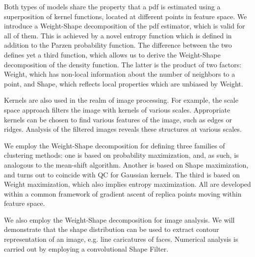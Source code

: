 \documentclass[preprint,12pt]{elsarticle}
\begin{document}
Both types of models share the property that a pdf is estimated using a superposition of kernel functions, located at different points in feature space. We introduce a Weight-Shape decomposition of the pdf estimator, which is valid for all of them. This is achieved by a novel entropy function which is defined in addition to the Parzen probability function. The difference between the two defines yet a third function, which allows us to derive the Weight-Shape decomposition of the density function. The latter is the product of two factors: Weight, which has non-local information about the number of neighbors to a point, and Shape, which reflects local properties which are unbiased by Weight.

Kernels are also used in the realm of image processing. For example, the scale space approach \cite{witkin1984} filters the image with kernels of various scales. Appropriate kernels can be chosen to find various features of the image, such as edges or ridges. Analysis of the filtered images reveals these structures at various scales.

We employ the Weight-Shape decomposition for defining three families of clustering methods: one is based on probability maximization, and, as such, is analogous to the mean-shift algorithm. Another is based on Shape maximization, and turns out to coincide with QC for Gaussian kernels. The third is based on Weight maximization, which also implies entropy maximization. All are developed within a common framework of gradient ascent of replica points moving within feature space.

We also employ the Weight-Shape decomposition for image analysis. We will demonstrate that the shape distribution can be used to extract contour representation of an image, e.g. line caricatures of faces. Numerical analysis is carried out by employing a convolutional Shape Filter.
\end{document}
